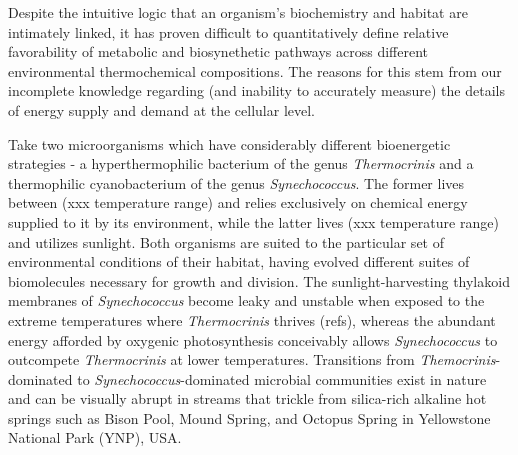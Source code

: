 Despite the intuitive logic that an organism's biochemistry and habitat are intimately linked, it has proven difficult to quantitatively define relative favorability of metabolic and biosynethetic pathways across different environmental thermochemical compositions. The reasons for this stem from our incomplete knowledge regarding (and inability to accurately measure) the details of energy supply and demand at the cellular level.

Take two microorganisms which have considerably different bioenergetic strategies - a hyperthermophilic bacterium of the genus \textit{Thermocrinis} and a thermophilic cyanobacterium of the genus \textit{Synechococcus}. The former lives between (xxx temperature range) and relies exclusively on chemical energy supplied to it by its environment, while the latter lives (xxx temperature range) and utilizes sunlight. Both organisms are suited to the particular set of environmental conditions of their habitat, having evolved different suites of biomolecules necessary for growth and division. The sunlight-harvesting thylakoid membranes of \textit{Synechococcus} become leaky and unstable when exposed to the extreme temperatures where \textit{Thermocrinis} thrives (refs), whereas the abundant energy afforded by oxygenic photosynthesis conceivably allows \textit{Synechococcus} to outcompete \textit{Thermocrinis} at lower temperatures.  Transitions from  \textit{Themocrinis}-dominated to  \textit{Synechococcus}-dominated microbial communities exist in nature and can be visually abrupt in streams that trickle from silica-rich alkaline hot springs such as Bison Pool, Mound Spring, and Octopus Spring in Yellowstone National Park (YNP), USA. 

